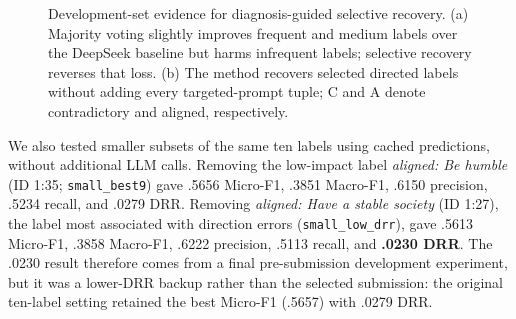\documentclass[sigconf,article,a4paper]{acmart}
\begin{document}
\begin{figure}[!t]
  \caption{Development-set evidence for diagnosis-guided selective recovery.
  (a) Majority voting slightly improves frequent and medium labels over the
  DeepSeek baseline but harms infrequent labels; selective recovery reverses
  that loss. (b) The method
  recovers selected directed labels without adding every targeted-prompt tuple;
  C and A denote contradictory and aligned, respectively.}
  \label{fig:liu-analysis}
\end{figure}

We also tested smaller subsets of the same ten labels using cached predictions,
without additional LLM calls. Removing the low-impact label \emph{aligned: Be
humble} (ID 1:35; \texttt{small\_best9})
gave .5656 Micro-F1, .3851 Macro-F1, .6150 precision, .5234 recall, and .0279
DRR. Removing \emph{aligned: Have a stable society} (ID 1:27), the label most
associated with direction errors (\texttt{small\_low\_drr}), gave .5613
Micro-F1, .3858 Macro-F1, .6222
precision, .5113 recall, and \textbf{.0230 DRR}. The .0230 result therefore
comes from a final pre-submission development experiment, but it was a
lower-DRR backup rather than the selected submission: the original ten-label
setting retained the best Micro-F1 (.5657) with .0279 DRR.
\end{document}

